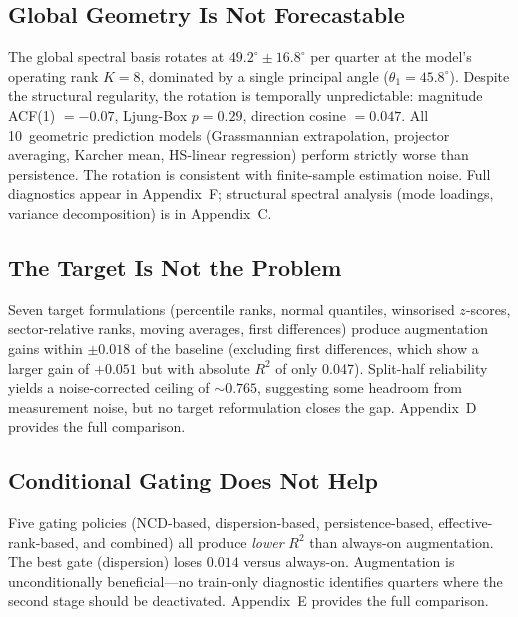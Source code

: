 \documentclass[11pt,a4paper]{article}
\begin{document}
\subsection{Global Geometry Is Not Forecastable}

The global spectral basis rotates at $49.2^\circ \pm 16.8^\circ$ per quarter at the model's operating rank $K{=}8$, dominated by a single principal angle ($\theta_1 = 45.8^\circ$). Despite the structural regularity, the rotation is temporally unpredictable: magnitude ACF(1) $= -0.07$, Ljung-Box $p = 0.29$, direction cosine $= 0.047$. All 10~geometric prediction models (Grassmannian extrapolation, projector averaging, Karcher mean, HS-linear regression) perform strictly worse than persistence. The rotation is consistent with finite-sample estimation noise. Full diagnostics appear in Appendix~F; structural spectral analysis (mode loadings, variance decomposition) is in Appendix~C.

\subsection{The Target Is Not the Problem}

Seven target formulations (percentile ranks, normal quantiles, winsorised $z$-scores, sector-relative ranks, moving averages, first differences) produce augmentation gains within $\pm 0.018$ of the baseline (excluding first differences, which show a larger gain of $+0.051$ but with absolute $R^2$ of only 0.047). Split-half reliability yields a noise-corrected ceiling of ${\sim}0.765$, suggesting some headroom from measurement noise, but no target reformulation closes the gap. Appendix~D provides the full comparison.

\subsection{Conditional Gating Does Not Help}

Five gating policies (NCD-based, dispersion-based, persistence-based, effective-rank-based, and combined) all produce \emph{lower} $R^2$ than always-on augmentation. The best gate (dispersion) loses $0.014$ versus always-on. Augmentation is unconditionally beneficial---no train-only diagnostic identifies quarters where the second stage should be deactivated. Appendix~E provides the full comparison.

\end{document}
